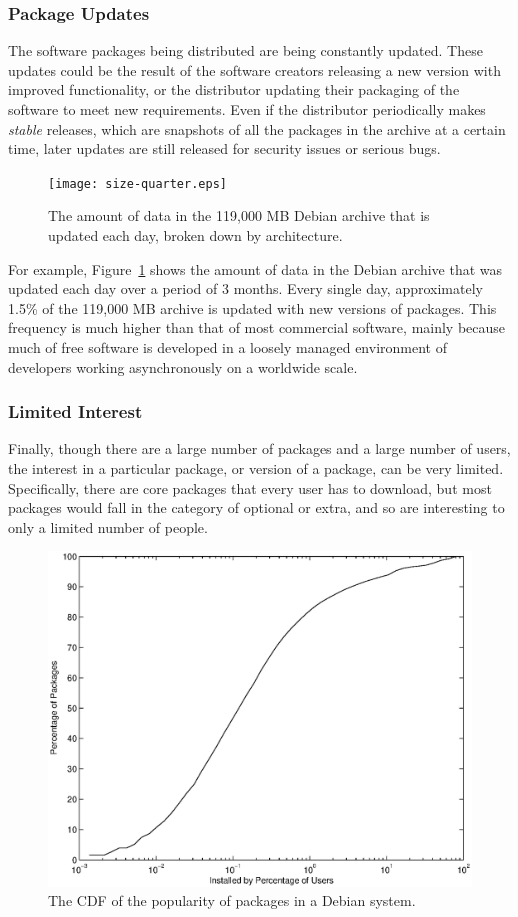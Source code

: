 \documentclass[conference]{IEEEtran}
\begin{document}
\subsubsection{Package Updates}

The software packages being distributed are being constantly
updated. These updates could be the result of the software creators
releasing a new version with improved functionality,
or the distributor updating their packaging of the
software to meet new requirements. Even if the distributor
periodically makes \emph{stable} releases, which are snapshots of
all the packages in the archive at a certain time, later updates are still
released for security issues or serious bugs.

\begin{figure}
\centering
\texttt{[image: size-quarter.eps]}
\caption{The amount of data in the 119,000 MB Debian archive that is
updated each day, broken down by architecture.}
\label{update_size}
\end{figure}

For example, Figure~\ref{update_size} shows the amount of data in
the Debian archive that was updated each day over a period of 3
months. Every single day, approximately 1.5\% of the 119,000 MB archive is
updated with new versions of packages. This frequency is much higher than
that of most commercial software, mainly because much of free software is
developed in a loosely managed environment of developers working
asynchronously on a worldwide scale.

\subsubsection{Limited Interest}

Finally, though there are a large number of packages and a large number of
users, the interest in a particular package, or version of a package, can be very
limited. Specifically, there are core packages that every user has to download, but most
packages would fall in the category of optional or extra, and so are
interesting to only a limited number of people.

\begin{figure}
\centering
\includegraphics[width=0.80\columnwidth]{apt_p2p_popularity-cdf.eps}
\caption{The CDF of the popularity of packages in a Debian system.}
\label{popularity_CDF}
\end{figure}
\end{document}
